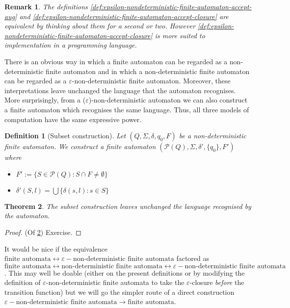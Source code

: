 \documentclass{article}
\theoremstyle{break}
\newtheorem{theorem}{Theorem}[section]
\newtheorem{definition}[theorem]{Definition}
\newtheorem*{remark}{Remark}
\begin{document}
\begin{remark}
  The definitions \ref{def:epsilon-nondeterministic-finite-automaton-accept-aug} and \ref{def:epsilon-nondeterministic-finite-automaton-accept-closure} are equivalent by thinking about them for a second or two.
  However \ref{def:epsilon-nondeterministic-finite-automaton-accept-closure} is more suited to implementation in a programming language.
\end{remark}

There is an obvious way in which a finite automaton can be regarded as a non-deterministic finite automaton and in which a non-deterministic finite automaton can be regarded as a $\varepsilon$-non-deterministic finite automaton. 
Moreover, these interpretations leave unchanged the language that the automaton recognises.
More surprisingly, from a ($\varepsilon$)-non-deterministic automaton we can also construct a finite automaton which recognises the same language.
Thus, all three models of computation have the same expressive power.

\begin{definition}[Subset construction]
\label{def:subset-construction}
  Let $(Q,\Sigma,\delta,q_0,F)$ be a non-deterministic finite automaton. 
  We construct a finite automaton $(\mathcal{P}(Q), \Sigma, \delta', \{q_0\}, F')$ where
  \begin{itemize}
    \item $F' := \{S\in \mathcal{P}(Q): S\cap F \neq \emptyset\}$
    \item $\delta'(S, l) = \bigcup \{\delta(s,l): s\in S\}$
  \end{itemize}
\end{definition}

\begin{theorem}
\label{thm:subset-construction}
The subset construction leaves unchanged the language recognised by the automaton.
\end{theorem}

\begin{proof}(Of \ref{thm:subset-construction})
  Exercise.
\end{proof}

It would be nice if the equivalence $\textrm{finite automata} \leftrightarrow \varepsilon-\textrm{non-deterministic finite automata}$ factored as $\textrm{finite automata} \leftrightarrow \textrm{non-deterministic finite automata} \leftrightarrow \varepsilon-\textrm{non-deterministic finite automata}$.
This may well be doable (either on the present definitions or by modifying the definition of $\varepsilon$-non-deterministic finite automata to take the $\varepsilon$-closure \textit{before} the transition function) but we will go the simpler route of a direct construction $\varepsilon-\textrm{non-deterministic finite automata} \to \textrm{finite automata}$.
\end{document}
